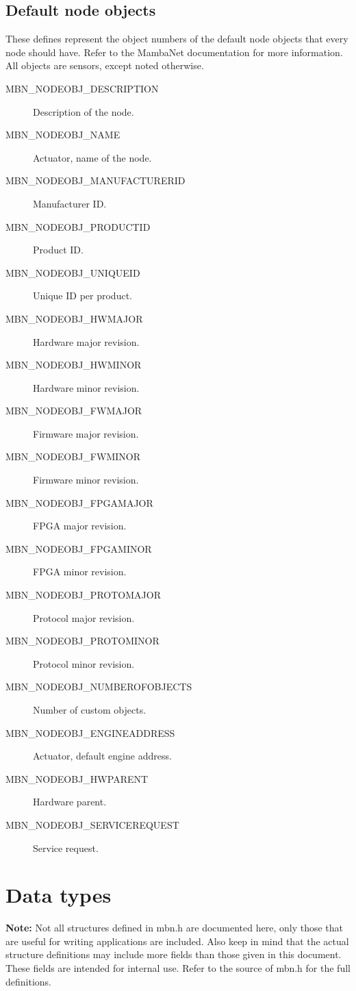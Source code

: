 \documentclass[a4paper]{report}
\begin{document}
\subsection{Default node objects}
These defines represent the object numbers of the default node objects that every node should have. Refer to the MambaNet documentation for more information. All objects are sensors, except noted otherwise.
\begin{description}
 \item[MBN\_NODEOBJ\_DESCRIPTION] Description of the node.
 \item[MBN\_NODEOBJ\_NAME] Actuator, name of the node.
 \item[MBN\_NODEOBJ\_MANUFACTURERID] Manufacturer ID.
 \item[MBN\_NODEOBJ\_PRODUCTID] Product ID.
 \item[MBN\_NODEOBJ\_UNIQUEID] Unique ID per product.
 \item[MBN\_NODEOBJ\_HWMAJOR] Hardware major revision.
 \item[MBN\_NODEOBJ\_HWMINOR] Hardware minor revision.
 \item[MBN\_NODEOBJ\_FWMAJOR] Firmware major revision.
 \item[MBN\_NODEOBJ\_FWMINOR] Firmware minor revision.
 \item[MBN\_NODEOBJ\_FPGAMAJOR] FPGA major revision.
 \item[MBN\_NODEOBJ\_FPGAMINOR] FPGA minor revision.
 \item[MBN\_NODEOBJ\_PROTOMAJOR] Protocol major revision.
 \item[MBN\_NODEOBJ\_PROTOMINOR] Protocol minor revision.
 \item[MBN\_NODEOBJ\_NUMBEROFOBJECTS] Number of custom objects.
 \item[MBN\_NODEOBJ\_ENGINEADDRESS] Actuator, default engine address.
 \item[MBN\_NODEOBJ\_HWPARENT] Hardware parent.
 \item[MBN\_NODEOBJ\_SERVICEREQUEST] Service request.
\end{description}




\cleardoublepage
\section{Data types}
\textbf{Note:} Not all structures defined in mbn.h are documented here, only those that are useful for writing applications are included. Also keep in mind that the actual structure definitions may include more fields than those given in this document. These fields are intended for internal use. Refer to the source of mbn.h for the full definitions.
\end{document}
